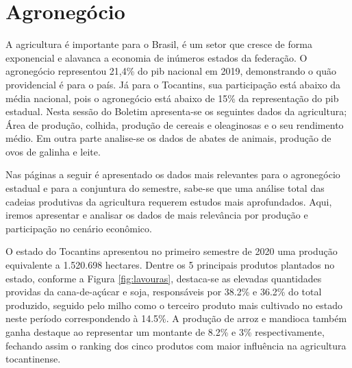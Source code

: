 \chapter{Agronegócio}
\par A agricultura é importante para o Brasil, é um setor que cresce de forma exponencial e alavanca a economia de inúmeros estados da federação. O agronegócio representou 21,4\% do \acrshort{pib} nacional em 2019, demonstrando o quão providencial é para o país. Já para o Tocantins, sua participação está abaixo da média nacional, pois o agronegócio está abaixo de 15\% da representação do \acrshort{pib} estadual. Nesta sessão do Boletim apresenta-se os seguintes dados da agricultura; Área de produção, colhida, produção de cereais e oleaginosas e o seu rendimento médio. Em outra parte analise-se os dados de abates de animais, produção de ovos de galinha e leite.
\par Nas páginas a seguir é apresentado os dados mais relevantes para o agronegócio estadual e para a conjuntura do semestre, sabe-se que uma análise total das cadeias produtivas da agricultura requerem estudos mais aprofundados. Aqui, iremos apresentar e analisar os dados de mais relevância por produção e participação no cenário econômico.

\par O estado do Tocantins apresentou no primeiro semestre de 2020 uma produção  equivalente a 1.520.698 hectares. Dentre os 5 principais produtos plantados no estado, conforme a Figura \ref{fig:lavouras}, destaca-se as elevadas quantidades providas da cana-de-açúcar e soja, responsáveis por 38.2\% e 36.2\% do total produzido, seguido pelo milho como o terceiro produto mais cultivado no estado neste período correspondendo à 14.5\%. A produção de arroz e mandioca também ganha destaque ao representar um montante de 8.2\% e 3\% respectivamente, fechando assim o ranking dos cinco produtos com maior influência na agricultura tocantinense.

